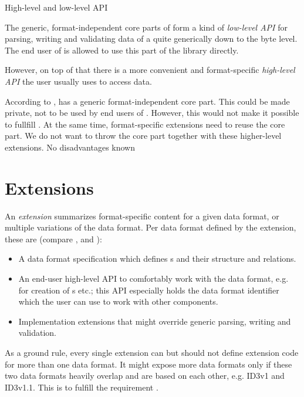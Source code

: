 {%
High-level and low-level API
}
{%
The generic, format-independent core parts of \LibName{} form a kind of \emph{low-level API} for parsing, writing and validating data of a \TERMcontainerFormat{} quite generically down to the byte level. The end user of \LibName{} is allowed to use this part of the library directly.

However, on top of that there is a more convenient and format-specific \emph{high-level API} the user usually uses to access data.
}
{%
According to , \LibName{} has a generic format-independent core part. This could be made private, not to be used by end users of \LibName{}. However, this would not make it possible to fullfill . At the same time, format-specific extensions need to reuse the core part. We do not want to throw the core part together with these higher-level extensions.
}
{%
No disadvantages known
}


\section{Extensions}
\label{sec:KompExt}

An \emph{extension} summarizes format-specific content for a given data format, or multiple variations of the data format. Per data format defined by the extension, these are (compare ,  and ):
\begin{itemize}
\item A data format specification which defines \TERMdataBlock{}s and their structure and relations.
\item An end-user high-level API to comfortably work with the data format, e.g. for creation of \TERMdataBlock{}s etc.; this API especially holds the data format identifier which the user can use to work with other components.
\item Implementation extensions that might override generic parsing, writing and validation.
\end{itemize}

As a ground rule, every single extension can but should not define extension code for more than one data format. It might expose more data formats only if these two data formats heavily overlap and are based on each other, e.g. ID3v1 and ID3v1.1. This is to fulfill the requirement .

